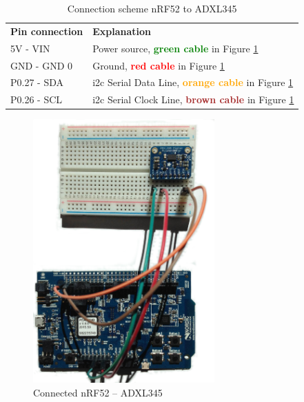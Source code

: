 \begin{table}[H]
\centering
\caption{Connection scheme nRF52 to ADXL345}
\label{nRF52ADXL345connection}
\begin{tabular}{ll}
\textbf{Pin connection} & \textbf{Explanation}                                                                                            \\
5V - VIN               & Power source, \textbf{\textcolor{green}{green cable}} in Figure \ref{fig:nrf-adxl345}                   \\
GND - GND           0   & Ground, \textbf{\textcolor{red}{red cable}} in Figure \ref{fig:nrf-adxl345}                             \\
P0.27 - SDA            & \gls{i2c} Serial Data Line, \textbf{\textcolor{orange}{orange cable}} in Figure \ref{fig:nrf-adxl345} \\
P0.26 - SCL            & \gls{i2c} Serial Clock Line, \textbf{\textcolor{brown}{brown cable}} in Figure \ref{fig:nrf-adxl345} 
\end{tabular}
\end{table}


\begin{figure}[ht]
    \centering
    \includegraphics[width=0.62\textwidth]{connectionADXL-nrf5.png}    
    \caption{Connected nRF52 -- ADXL345}
    \label{fig:nrf-adxl345}
\end{figure}

\newpage

